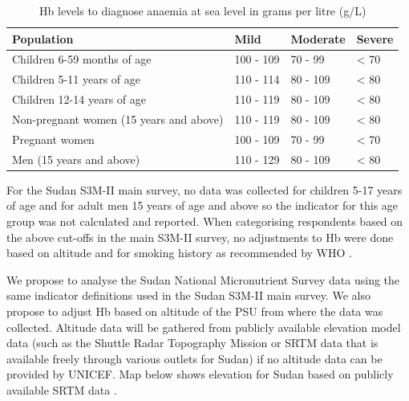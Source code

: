\documentclass[12pt,a4paper]{article}
\begin{document}
\begin{table}[H]

\caption{\label{tab:hb1}Hb levels to diagnose anaemia at sea level in grams per litre (g/L)}
\centering
\begin{tabular}[t]{llll}
\toprule
\textbf{Population} & \textbf{Mild} & \textbf{Moderate} & \textbf{Severe}\\
\midrule
\rowcolor{gray!6}  Children 6-59 months of age & 100 - 109 & 70 - 99 & < 70\\
Children 5-11 years of age & 110 - 114 & 80 - 109 & < 80\\
\rowcolor{gray!6}  Children 12-14 years of age & 110 - 119 & 80 - 109 & < 80\\
Non-pregnant women
(15 years and above) & 110 - 119 & 80 - 109 & < 80\\
\rowcolor{gray!6}  Pregnant women & 100 - 109 & 70 - 99 & < 70\\
\addlinespace
Men
(15 years and above) & 110 - 129 & 80 - 109 & < 80\\
\bottomrule
\end{tabular}
\end{table}

For the Sudan S3M-II main survey, no data was collected for children 5-17 years of age and for adult men 15 years of age and above so the indicator for this age group was not calculated and reported. When categorising respondents based on the above cut-offs in the main S3M-II survey, no adjustments to Hb were done based on altitude and for smoking history as recommended by WHO \citep{WorldHealthOrganization:2007tx, WorldHealthOrganization:2011ut}.

We propose to analyse the Sudan National Micronutrient Survey data using the same indicator definitions used in the Sudan S3M-II main survey. We also propose to adjust Hb based on altitude of the PSU from where the data was collected. Altitude data will be gathered from publicly available elevation model data (such as the Shuttle Radar Topography Mission or SRTM data that is available freely through various outlets for Sudan) if no altitude data can be provided by UNICEF. Map below shows elevation for Sudan based on publicly available SRTM data \citep{cgiar:2020}.
\end{document}
